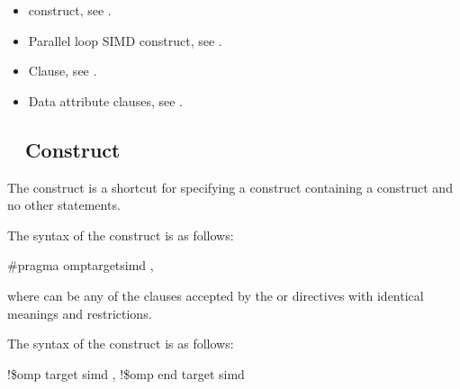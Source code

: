 \crossreferences
\begin{itemize}
\item {} construct, see
.

\item Parallel loop SIMD construct, see
.

\item {} Clause, see .

\item Data attribute clauses, see
.

\end{itemize}










\subsection{~ Construct}
\label{subsec:target simd Construct}

\summary
The   construct is a shortcut for specifying a  
construct containing a  construct and no other statements.

\syntax
\ccppspecificstart
The syntax of the   construct is as follows:

\begin{boxedcode}
\#pragma omp\plc{ }target\plc{ }simd \plc{[clause[ [},\plc{] clause] ... ]}
\end{boxedcode}

where  can be any of the clauses accepted by the  or
 directives with identical meanings and restrictions.

\ccppspecificend

\begin{samepage}
\fortranspecificstart
The syntax of the   construct is as follows:

\begin{boxedcode}
!\$omp target simd \plc{[clause[ [},\plc{] clause] ... ]}
\plc{[}!\$omp end target simd\plc{]}
\end{boxedcode}
\end{samepage}

